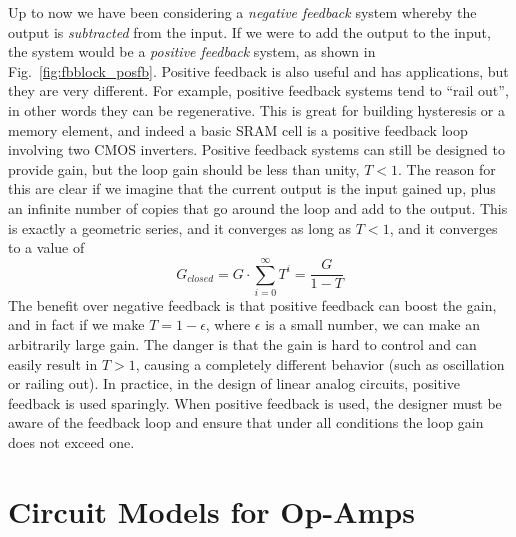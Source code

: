 Up to now we have been considering a \textit{negative feedback} system whereby the output is \textit{subtracted} from the input. If we were to add the output to the input, the system would be a \textit{positive feedback} system, as shown in Fig.~\ref{fig:fbblock_posfb}.  Positive feedback is also useful and has applications, but they are very different.  For example, positive feedback systems tend to “rail out”, in other words they can be regenerative.  This is great for building hysteresis or a memory element, and indeed a basic SRAM cell is a positive feedback loop involving two CMOS inverters.  Positive feedback systems can still be designed to provide gain, but the loop gain should be less than unity, $T < 1$.  The reason for this are clear if we imagine that the current output is the input gained up, plus an infinite number of copies that go around the loop and add to the output.  This is exactly a geometric series, and it converges as long as $T< 1$, and it converges to a value of
\begin{equation}
	G_{closed} = G \cdot \sum_{i=0}^\infty T^i = \frac{G}{1 - T}
\end{equation}
The benefit over negative feedback is that positive feedback can boost the gain, and in fact if we make $T = 1 - \epsilon$, where $\epsilon$ is a small number, we can make an arbitrarily large gain.  The danger is that the gain is hard to control and can easily result in $T> 1$, causing a completely different behavior (such as oscillation or railing out).  In practice, in the design of linear analog circuits, positive feedback is used sparingly.  When positive feedback is used, the designer must be aware of the feedback loop and ensure that under all conditions the loop gain does not exceed one.
\section{Circuit Models for Op-Amps}
